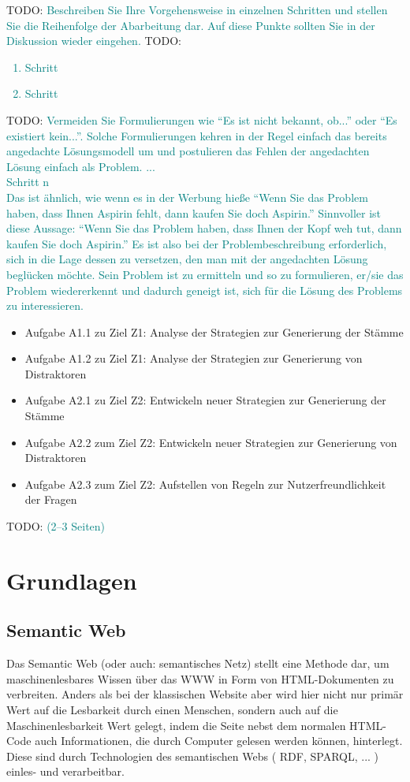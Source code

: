 \documentclass[headsepline,titlepage,ngerman,twoside,12pt]{report}
\newcommand\todo[1]{TODO: \textcolor{teal}{#1}}
\begin{document}
\todo{
Beschreiben Sie Ihre Vorgehensweise in einzelnen Schritten und stellen Sie die Reihenfolge der Abarbeitung dar.
Auf diese Punkte sollten Sie in der Diskussion wieder eingehen.
}
\todo{
\begin{enumerate}
\item Schritt 
\item Schritt 
\end{enumerate}
}
\todo{
Vermeiden Sie Formulierungen wie \enquote{Es ist nicht bekannt, ob...} oder \enquote{Es existiert kein...}.
Solche Formulierungen kehren in der Regel einfach das bereits angedachte Lösungsmodell um und postulieren das Fehlen der angedachten Lösung einfach als Problem.
... \\
Schritt n\\
Das ist ähnlich, wie wenn es in der Werbung hieße \enquote{Wenn Sie das Problem haben, dass Ihnen Aspirin fehlt, dann kaufen Sie doch Aspirin.}
Sinnvoller ist diese Aussage: \enquote{Wenn Sie das Problem haben, dass Ihnen der Kopf weh tut, dann kaufen Sie doch Aspirin.}
Es ist also bei der Problembeschreibung erforderlich, sich in die Lage dessen zu versetzen, den man mit der angedachten Lösung beglücken möchte.
Sein Problem ist zu ermitteln und so zu formulieren, er/sie das Problem wiedererkennt und dadurch geneigt ist, sich für die Lösung des Problems zu interessieren.
} 
\begin{itemize}
    \item Aufgabe A1.1 zu Ziel Z1: Analyse der Strategien zur Generierung der Stämme
    \item Aufgabe A1.2 zu Ziel Z1: Analyse der Strategien zur Generierung von Distraktoren 
    \item Aufgabe A2.1 zu Ziel Z2: Entwickeln neuer Strategien zur Generierung der Stämme
    \item Aufgabe A2.2 zum Ziel Z2: Entwickeln neuer Strategien zur Generierung von Distraktoren
    \item Aufgabe A2.3 zum Ziel Z2: Aufstellen von Regeln zur Nutzerfreundlichkeit der Fragen
\end{itemize}

\todo{(2--3 Seiten)}
\chapter{Grundlagen}
\label{ch:Grundlagen}

\section{Semantic Web}
\label{sec:semanticweb}
Das Semantic Web (oder auch: semantisches Netz) stellt eine Methode dar, um maschinenlesbares Wissen über das \ac{WWW} in Form von HTML-Dokumenten zu verbreiten.
Anders als bei der klassischen Website aber wird hier nicht nur primär Wert auf die Lesbarkeit durch einen Menschen, sondern auch auf die Maschinenlesbarkeit Wert gelegt, indem die Seite nebst dem normalen HTML-Code auch Informationen, die durch Computer gelesen werden können, hinterlegt. Diese sind durch Technologien des semantischen Webs ( \acs{RDF}, \acs{SPARQL}, ... ) einles- und verarbeitbar.
\end{document}
